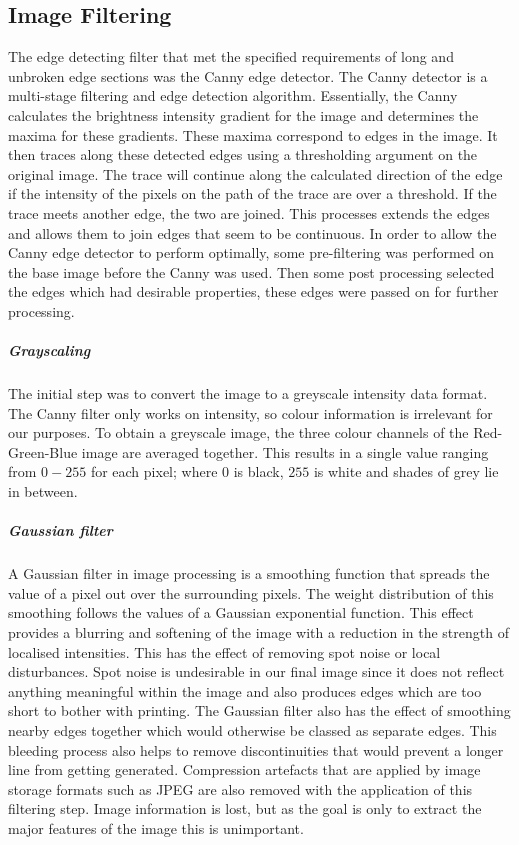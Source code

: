 \subsection{Image Filtering}
The edge detecting filter that met the specified requirements of long and unbroken edge sections was the Canny edge detector. The Canny detector is a multi-stage filtering and edge detection algorithm. Essentially, the Canny calculates the brightness intensity gradient for the image and determines the maxima for these gradients. These maxima correspond to edges in the image. It then traces along these detected edges using a thresholding argument on the original image. The trace will continue along the calculated direction of the edge if the intensity of the pixels on the path of the trace are over a threshold. If the trace meets another edge, the two are joined. This processes extends the edges and allows them to join edges that seem to be continuous.
In order to allow the Canny edge detector to perform optimally, some pre-filtering was performed on the base image before the Canny was used. Then some post processing selected the edges which had desirable properties, these edges were passed on for further processing.
\subparagraph{Grayscaling}
The initial step was to convert the image to a greyscale intensity data format. The Canny filter only works on intensity, so colour information is irrelevant for our purposes. To obtain a greyscale image, the three colour channels of the Red-Green-Blue image are averaged together. This results in a single value ranging from $0-255$ for each pixel; where $0$ is black, $255$ is white and shades of grey lie in between.
\subparagraph{Gaussian filter}
A Gaussian filter in image processing is a smoothing function that spreads the value of a pixel out over the surrounding pixels. The weight distribution of this smoothing follows the values of a Gaussian exponential function. This effect provides a blurring and softening of the image with a reduction in the strength of localised intensities. This has the effect of removing spot noise or local disturbances. Spot noise is undesirable in our final image since it does not reflect anything meaningful within the image and also produces edges which are too short to bother with printing. The Gaussian filter also has the effect of smoothing nearby edges together which would otherwise be classed as separate edges. This bleeding process also helps to remove discontinuities that would prevent a longer line from getting generated. Compression artefacts that are applied by image storage formats such as JPEG are also removed with the application of this filtering step. Image information is lost, but as the goal is only to extract the major features of the image this is unimportant.
